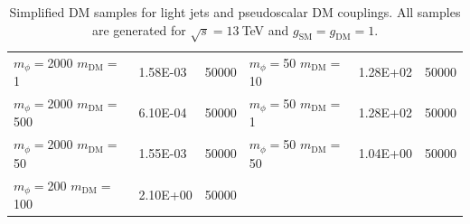 \begin{table}[]
\begin{tabular}{lll||lll}
$m_\phi=$2000 $m_\textrm{DM}=$1     & 1.58E-03     & 50000                  &  $m_\phi=$50 $m_\textrm{DM}=$10      & 1.28E+02     & 50000                  \\ 
$m_\phi=$2000 $m_\textrm{DM}=$500   & 6.10E-04     & 50000                  &  $m_\phi=$50 $m_\textrm{DM}=$1       & 1.28E+02     & 50000                  \\ 
$m_\phi=$2000 $m_\textrm{DM}=$50    & 1.55E-03     & 50000                  &  $m_\phi=$50 $m_\textrm{DM}=$50      & 1.04E+00     & 50000                  \\
$m_\phi=$200 $m_\textrm{DM}=$100    & 2.10E+00     & 50000                  & \\\hline
\end{tabular}
\caption{Simplified DM samples for light jets and pseudoscalar DM couplings. All samples are generated for $\sqrt{s}=13~$TeV and $g_\textrm{SM}=g_\textrm{DM}=1$.}
\label{tab:samples_ps}
\end{table}




